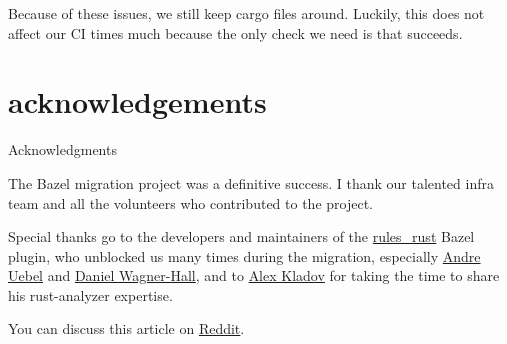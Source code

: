 \documentclass{article}
\begin{document}
Because of these issues, we still keep cargo files around. Luckily, this does not affect our CI times much because the only check we need is that  succeeds. 

\section{acknowledgements}{Acknowledgments}

The Bazel migration project was a definitive success.
I thank our talented infra team and all the volunteers who contributed to the project.

Special thanks go to the developers and maintainers of the \href{https://bazelbuild.github.io/rules_rust/}{rules_rust} Bazel plugin, who unblocked us many times during the migration, especially \href{https://github.com/UebelAndre}{Andre Uebel} and \href{https://github.com/illicitonion}{Daniel Wagner-Hall}, and to \href{https://github.com/matklad}{Alex Kladov} for taking the time to share his rust-analyzer expertise.

You can discuss this article on \href{https://www.reddit.com/r/rust/comments/11xxffc/blog_post_scaling_rust_builds_with_bazel/}{Reddit}.
\end{document}
